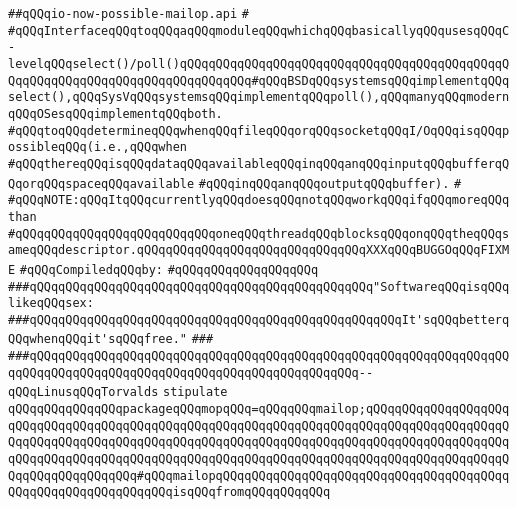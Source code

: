 \label{src/lib/src/lib/thread-kit/src/core-thread-kit/io-now-possible-mailop.api}
\verb|##qQQqio-now-possible-mailop.api|\newline
\verb|#|\newline
\verb|#qQQqInterfaceqQQqtoqQQqaqQQqmoduleqQQqwhichqQQqbasicallyqQQqusesqQQqC-levelqQQqselect()/poll()qQQqqQQqqQQqqQQqqQQqqQQqqQQqqQQqqQQqqQQqqQQqqQQqqQQqqQQqqQQqqQQqqQQqqQQqqQQqqQQq#qQQqBSDqQQqsystemsqQQqimplementqQQqselect(),qQQqSysVqQQqsystemsqQQqimplementqQQqpoll(),qQQqmanyqQQqmodernqQQqOSesqQQqimplementqQQqboth.|\newline
\verb|#qQQqtoqQQqdetermineqQQqwhenqQQqfileqQQqorqQQqsocketqQQqI/OqQQqisqQQqpossibleqQQq(i.e.,qQQqwhen|\newline
\verb|#qQQqthereqQQqisqQQqdataqQQqavailableqQQqinqQQqanqQQqinputqQQqbufferqQQqorqQQqspaceqQQqavailable|\newline
\verb|#qQQqinqQQqanqQQqoutputqQQqbuffer).|\newline
\verb|#|\newline
\verb|#qQQqNOTE:qQQqItqQQqcurrentlyqQQqdoesqQQqnotqQQqworkqQQqifqQQqmoreqQQqthan|\newline
\verb|#qQQqqQQqqQQqqQQqqQQqqQQqqQQqoneqQQqthreadqQQqblocksqQQqonqQQqtheqQQqsameqQQqdescriptor.qQQqqQQqqQQqqQQqqQQqqQQqqQQqqQQqXXXqQQqBUGGOqQQqFIXME|\newline
\newline
\verb|#qQQqCompiledqQQqby:|\newline
\verb|#qQQqqQQqqQQqqQQqqQQq|\newline
\newline
\newline
\newline
\verb|###qQQqqQQqqQQqqQQqqQQqqQQqqQQqqQQqqQQqqQQqqQQqqQQq"SoftwareqQQqisqQQqlikeqQQqsex:|\newline
\verb|###qQQqqQQqqQQqqQQqqQQqqQQqqQQqqQQqqQQqqQQqqQQqqQQqqQQqIt'sqQQqbetterqQQqwhenqQQqit'sqQQqfree."|\newline
\verb|###|\newline
\verb|###qQQqqQQqqQQqqQQqqQQqqQQqqQQqqQQqqQQqqQQqqQQqqQQqqQQqqQQqqQQqqQQqqQQqqQQqqQQqqQQqqQQqqQQqqQQqqQQqqQQqqQQqqQQqqQQqqQQq--qQQqLinusqQQqTorvalds|\newline
\newline
\newline
\newline
\verb|stipulate|\newline
\verb|qQQqqQQqqQQqqQQqpackageqQQqmopqQQq=qQQqqQQqmailop;qQQqqQQqqQQqqQQqqQQqqQQqqQQqqQQqqQQqqQQqqQQqqQQqqQQqqQQqqQQqqQQqqQQqqQQqqQQqqQQqqQQqqQQqqQQqqQQqqQQqqQQqqQQqqQQqqQQqqQQqqQQqqQQqqQQqqQQqqQQqqQQqqQQqqQQqqQQqqQQqqQQqqQQqqQQqqQQqqQQqqQQqqQQqqQQqqQQqqQQqqQQqqQQqqQQqqQQqqQQqqQQqqQQqqQQqqQQqqQQqqQQqqQQq#qQQqmailopqQQqqQQqqQQqqQQqqQQqqQQqqQQqqQQqqQQqqQQqqQQqqQQqqQQqqQQqqQQqqQQqisqQQqfromqQQqqQQqqQQq|\newline
